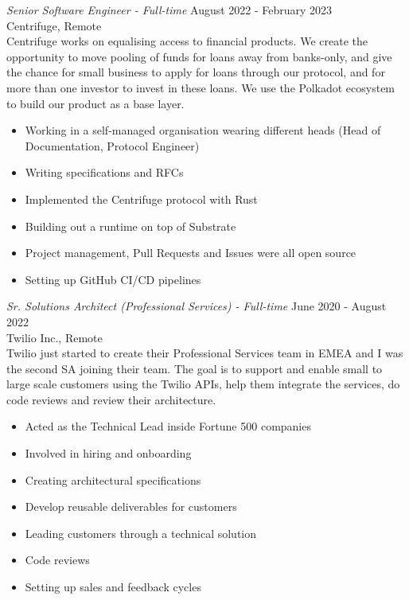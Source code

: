 \documentclass[10pt]{res} %
\begin{document}
\begin{resume}
{\sl Senior Software Engineer - Full-time} \hfill August 2022 - February 2023 \\
Centrifuge, Remote \\
Centrifuge works on equalising access to financial products. We create the opportunity to move pooling of funds for loans away from banks-only, and give the chance for small business to apply for loans through our protocol, and for more than one investor to invest in these loans. We use the Polkadot ecosystem to build our product as a base layer.
\begin{itemize} \itemsep -2pt %
\item Working in a self-managed organisation wearing different heads (Head of Documentation, Protocol Engineer)
\item Writing specifications and RFCs 
\item Implemented the Centrifuge protocol with Rust
\item Building out a runtime on top of Substrate
\item Project management, Pull Requests and Issues were all open source
\item Setting up GitHub CI/CD pipelines
\end{itemize}

{\sl Sr. Solutions Architect (Professional Services) - Full-time} \hfill June 2020 - August 2022 \\
Twilio Inc., Remote \\
Twilio just started to create their Professional Services team in EMEA and I was the second SA joining their team. The goal is to support and enable small to large scale customers using the Twilio APIs, help them integrate the services, do code reviews and review their architecture.
\begin{itemize} \itemsep -2pt %
\item Acted as the Technical Lead inside Fortune 500 companies
\item Involved in hiring and onboarding
\item Creating architectural specifications
\item Develop reusable deliverables for customers
\item Leading customers through a technical solution
\item Code reviews
\item Setting up sales and feedback cycles
\end{itemize}


\end{resume}
\end{document}

